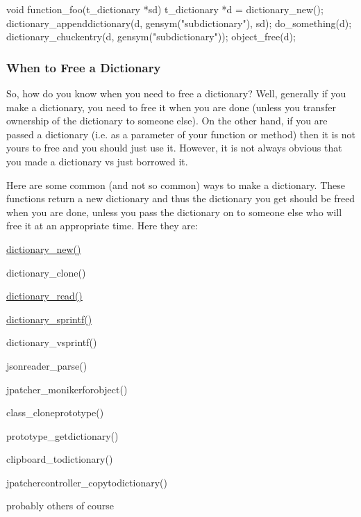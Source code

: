 \begin{DoxyCode}
    void function_foo(t_dictionary *sd) {
      t_dictionary *d = dictionary_new(); 
      dictionary_appenddictionary(d, gensym("subdictionary"), sd); 
      do_something(d); 
      dictionary_chuckentry(d, gensym("subdictionary")); 
      object_free(d);  
    }
\end{DoxyCode}
\hypertarget{group__dictionary_when_to_free_a_dictionary}{}\subsubsection{When to Free a Dictionary}\label{group__dictionary_when_to_free_a_dictionary}
So, how do you know when you need to free a dictionary? Well, generally if you make a dictionary, you need to free it when you are done (unless you transfer ownership of the dictionary to someone else). On the other hand, if you are passed a dictionary (i.e. as a parameter of your function or method) then it is not yours to free and you should just use it. However, it is not always obvious that you made a dictionary vs just borrowed it.

Here are some common (and not so common) ways to make a dictionary. These functions return a new dictionary and thus the dictionary you get should be freed when you are done, unless you pass the dictionary on to someone else who will free it at an appropriate time. Here they are: 
\begin{DoxyItemize}
\item \hyperlink{group__dictionary_ga9d89ea4cf5b0aaf87fba6027c3ec223c}{dictionary\_\-new()}  
\item dictionary\_\-clone()  
\item \hyperlink{group__dictionary_ga2c64f2e3bce940ca992b3dd3ffe292ac}{dictionary\_\-read()}  
\item \hyperlink{group__dictionary_ga77d5bafc260f9fc0bf3b4ad35f2b2629}{dictionary\_\-sprintf()}  
\item dictionary\_\-vsprintf()  
\item jsonreader\_\-parse()  
\item jpatcher\_\-monikerforobject()  
\item class\_\-cloneprototype()  
\item prototype\_\-getdictionary()  
\item clipboard\_\-todictionary()  
\item jpatchercontroller\_\-copytodictionary()  
\item probably others of course 
\end{DoxyItemize}

